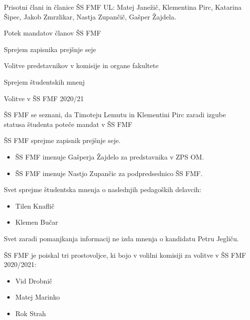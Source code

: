\documentclass{seja}
\begin{document}
Prisotni člani in članice ŠS FMF UL:
Matej Janežič,
Klementina Pirc,
Katarina Šipec,
Jakob Zmrzlikar,
Nastja Zupančič,
Gašper Žajdela.


\begin{red*}
    \item
    Potek mandatov članov ŠS FMF
	\item
	Sprejem zapisnika prejšnje seje
	\item
	Volitve predstavnikov v komisije in organe fakultete
    \item
    Sprejem študentskih mnenj
    \item 
    Volitve v ŠS FMF 2020/21
\end{red*}



\begin{ad}
    \item 
    ŠS FMF se seznani, da Timoteju Lemutu in Klementini Pirc zaradi izgube statusa študenta poteče mandat v ŠS FMF
    \item
    \begin{sklep*}
        ŠS FMF sprejme zapisnik prejšnje seje.
    \end{sklep*}

    \item
    \begin{sklep*}
        \begin{itemize}
        \item ŠS FMF imenuje Gašperja Žajdelo za predstavnika v ZPS OM.
        \item ŠS FMF imenuje Nastjo Zupančic za podpredsednico ŠS FMF. 
        \end{itemize}
    \end{sklep*}
    
    \item 
    \begin{sklep*}
    Svet sprejme študentska mnenja o naslednjih pedagoških delavcih:
        \begin{itemize}
            \item Tilen Knaflič
            \item Klemen Bučar
        \end{itemize}
    Svet zaradi pomanjkanja informacij ne izda mnenja o kandidatu Petru Jegliču.
    \end{sklep*}
    
    \item
    ŠS FMF je poiskal tri prostovoljce, ki bojo v volilni komisiji za volitve v ŠS FMF 2020/2021:
    \begin{itemize}
        \item Vid Drobnič
        \item Matej Marinko
        \item Rok Strah
    \end{itemize}
    
\end{ad}
\end{document}
